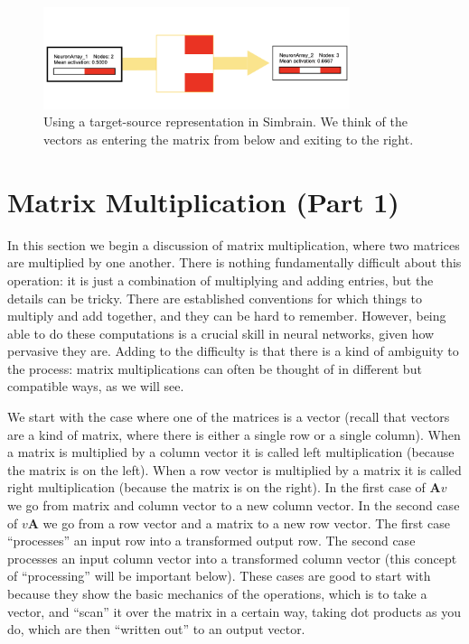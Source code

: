 \begin{figure}[h]
\centering
\includegraphics[width=0.8\textwidth]{images/targetSourceSimbrain.png}
\caption[Jeff Yoshimi.]{Using a target-source representation in Simbrain. We think of the vectors as entering the matrix from below and exiting to the right.}
\label{targetSourceSimbrain}
\end{figure}

\section{Matrix Multiplication (Part 1)}

In this section we begin a discussion of matrix multiplication, where two matrices are multiplied by one another. There is nothing fundamentally difficult about this operation: it is just a combination of multiplying and adding entries, but the details can be tricky. There are established conventions for which things to multiply and add together, and they can be hard to remember. However, being able to do these computations is a crucial skill in neural networks, given how pervasive they are. Adding to the difficulty is that there is a kind of ambiguity to the process: matrix multiplications can often be thought of in different but compatible ways, as we will see.

We start with the case where one of the matrices is a vector (recall that vectors are a kind of matrix, where there is either a single row or a single column). When a matrix is multiplied by a column vector it is called left multiplication (because the matrix is on the left). When a row vector is multiplied by a matrix it is called right multiplication (because the matrix is on the right). In the first case of $\mathbf{A}v$ we go from matrix and column vector to a new column vector. In the second case of $v\mathbf{A}$ we go from a row vector and a matrix to a new row vector.  The first case ``processes'' an input row into a transformed output row. The second case processes an input column vector into a transformed column vector (this concept of ``processing'' will be important below). These cases are good to start with because they show the basic mechanics of the operations, which is to take a vector, and ``scan'' it over the matrix in a certain way, taking dot products as you do, which are then ``written out'' to an output vector.  

